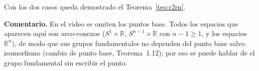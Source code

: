 \documentclass[11pt]{article}
\begin{document}
Con los dos casos queda demostrado el Teorema~\ref{teo:r2rn}.

\noindent\textbf{Comentario.} En el video se omiten los puntos base. Todos los espacios que aparecen aquí son arco-conexos ($S^1\times\mathbb{R}$, $S^{n-1}\times\mathbb{R}$ con $n-1\geq 1$, y los espacios $\mathbb{R}^n$), de modo que sus grupos fundamentales no dependen del punto base salvo isomorfismo (cambio de punto base, Teorema~1.12); por eso se puede hablar de \guillemotleft{}el\guillemotright{} grupo fundamental sin escribir el punto.

\begin{erratas}
\end{erratas}
\end{document}
